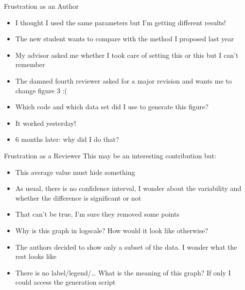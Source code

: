 \documentclass[11pt,xcolor=dvipsnames]{beamer}
\begin{document}
\label{sec-1}
\begin{frame}[label=sec-1-0-1]{Frustration as an Author }
\begin{itemize}
\item I thought I used the same parameters but \alert{I'm getting different
results!}
\item The new student wants to compare with \alert{the method I proposed last
year}
\item My advisor asked me whether I took care of setting this or this but
I can't remember
\item The damned fourth reviewer asked for a major revision and wants me
to \alert{change figure 3} :(
\item \alert{Which code} and \alert{which data set} did I use to generate this figure?
\item It \alert{worked yesterday}!
\item 6 months later: \alert{why} did I do that?
\end{itemize}
\end{frame}
\begin{frame}[label=sec-1-0-2]{Frustration as a Reviewer }
This may be an interesting contribution but:
\begin{itemize}
\item This \alert{average value} must hide something
\item As usual, there is no \alert{confidence interval}, I wonder about the
variability and whether the difference is \alert{significant} or not
\item That can't be true, I'm sure they \alert{removed some points}
\item Why is this graph in \alert{logscale}? How would it look like otherwise?
\item The authors decided to show only a \alert{subset of the data}. I wonder
what the rest looks like
\item There is no label/legend/\ldots{} What is the \alert{meaning of this graph}?
If only I could access the generation script
\end{itemize}
\end{frame}
\end{document}
